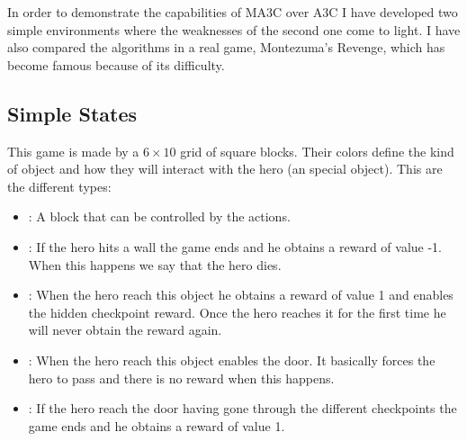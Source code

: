 In order to demonstrate the capabilities of \ac{MA3C} over \ac{A3C} I have developed two simple environments where the
weaknesses of the second one come to light.
I have also compared the algorithms in a real game, Montezuma's Revenge, which has become famous because of its difficulty.

\subsection{Simple States\label{subsec:SimpleStates}}

This game is made by a $6 \times 10$ grid of square blocks.
Their colors define the kind of object and how they will interact with the hero (an special object).
This are the different types:
\begin{itemize}
  \item {}: A block that can be controlled by the actions.
  \item {}: If the hero hits a wall the game ends and he obtains a reward of value -1.
  When this happens we say that the hero dies.
  \item {}: When the hero reach this object he obtains a reward of value 1 and enables the hidden
  checkpoint reward.
  Once the hero reaches it for the first time he will never obtain the reward again.
  \item {}: When the hero reach this object enables the door.
  It basically forces the hero to pass and there is no reward when this happens.
  \item {}: If the hero reach the door having gone through the different checkpoints the game ends and
  he obtains a reward of value 1.
\end{itemize}

